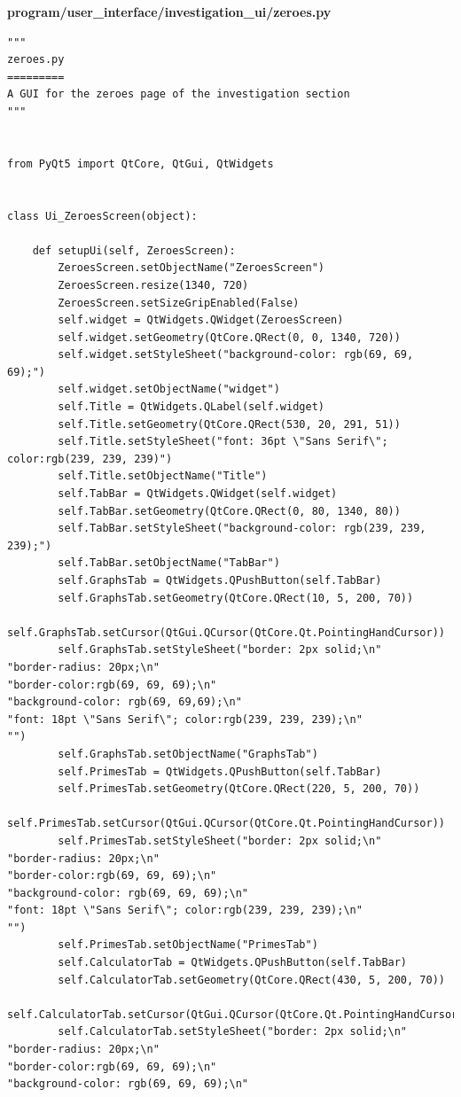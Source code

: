 \documentclass{article}
\begin{document}
\clearpage
\textbf{program/user\_interface/investigation\_ui/zeroes.py}
\begin{lstlisting}
"""
zeroes.py
=========
A GUI for the zeroes page of the investigation section
"""


from PyQt5 import QtCore, QtGui, QtWidgets


class Ui_ZeroesScreen(object):

    def setupUi(self, ZeroesScreen):
        ZeroesScreen.setObjectName("ZeroesScreen")
        ZeroesScreen.resize(1340, 720)
        ZeroesScreen.setSizeGripEnabled(False)
        self.widget = QtWidgets.QWidget(ZeroesScreen)
        self.widget.setGeometry(QtCore.QRect(0, 0, 1340, 720))
        self.widget.setStyleSheet("background-color: rgb(69, 69, 69);")
        self.widget.setObjectName("widget")
        self.Title = QtWidgets.QLabel(self.widget)
        self.Title.setGeometry(QtCore.QRect(530, 20, 291, 51))
        self.Title.setStyleSheet("font: 36pt \"Sans Serif\"; color:rgb(239, 239, 239)")
        self.Title.setObjectName("Title")
        self.TabBar = QtWidgets.QWidget(self.widget)
        self.TabBar.setGeometry(QtCore.QRect(0, 80, 1340, 80))
        self.TabBar.setStyleSheet("background-color: rgb(239, 239, 239);")
        self.TabBar.setObjectName("TabBar")
        self.GraphsTab = QtWidgets.QPushButton(self.TabBar)
        self.GraphsTab.setGeometry(QtCore.QRect(10, 5, 200, 70))
        self.GraphsTab.setCursor(QtGui.QCursor(QtCore.Qt.PointingHandCursor))
        self.GraphsTab.setStyleSheet("border: 2px solid;\n"
"border-radius: 20px;\n"
"border-color:rgb(69, 69, 69);\n"
"background-color: rgb(69, 69,69);\n"
"font: 18pt \"Sans Serif\"; color:rgb(239, 239, 239);\n"
"")
        self.GraphsTab.setObjectName("GraphsTab")
        self.PrimesTab = QtWidgets.QPushButton(self.TabBar)
        self.PrimesTab.setGeometry(QtCore.QRect(220, 5, 200, 70))
        self.PrimesTab.setCursor(QtGui.QCursor(QtCore.Qt.PointingHandCursor))
        self.PrimesTab.setStyleSheet("border: 2px solid;\n"
"border-radius: 20px;\n"
"border-color:rgb(69, 69, 69);\n"
"background-color: rgb(69, 69, 69);\n"
"font: 18pt \"Sans Serif\"; color:rgb(239, 239, 239);\n"
"")
        self.PrimesTab.setObjectName("PrimesTab")
        self.CalculatorTab = QtWidgets.QPushButton(self.TabBar)
        self.CalculatorTab.setGeometry(QtCore.QRect(430, 5, 200, 70))
        self.CalculatorTab.setCursor(QtGui.QCursor(QtCore.Qt.PointingHandCursor))
        self.CalculatorTab.setStyleSheet("border: 2px solid;\n"
"border-radius: 20px;\n"
"border-color:rgb(69, 69, 69);\n"
"background-color: rgb(69, 69, 69);\n"

\end{lstlisting}
\end{document}
